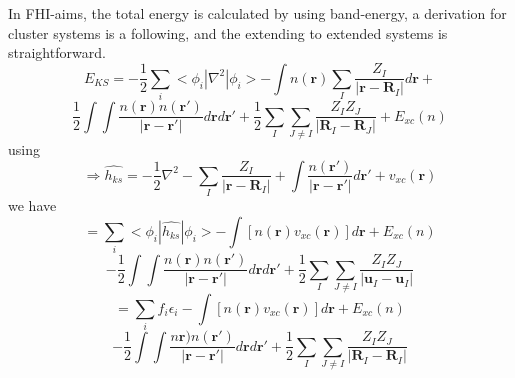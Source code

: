 In FHI-aims, the total energy is calculated by using band-energy, a derivation for cluster systems is a following, and the extending to extended systems is straightforward.
\[
E_{KS}=-\dfrac{1}{2}\sum_{i}<\phi_i|\nabla^2|\phi_i>-\int {n(\mathbf{r})  \sum_{I}\dfrac{Z_{I}}{|\mathbf{r}-\mathbf{R}_{I}|}  d\mathbf{r}}+
\]
\begin{equation}
 \dfrac{1}{2}\int \int {\dfrac{n(\mathbf{r}) n(\mathbf{r'}) }{|\mathbf{r}-\mathbf{r'} |}  d\mathbf{r}  d\mathbf{r'}} +\dfrac{1}{2}\sum_{I}\sum_{J\neq I}{\dfrac{Z_{I} Z_{J}}{|\mathbf{R}_{I}-\mathbf{R}_{J} |} }+ E_{xc}(n)
 \label{eq:E_KS_original}
\end{equation}
using 
\[
\Rightarrow
\hat{h_{ks}}=-\dfrac{1}{2}\nabla^2- \sum_{I}\dfrac{Z_{I}}{|\mathbf{r}-\mathbf{R}_{I}|}
+ \int {\dfrac{n(\mathbf{r'}) }{|\mathbf{r}-\mathbf{r'} |}  d\mathbf{r'}} + v_{xc}(\mathbf{r})
\]
we have 
\[
= \sum_{i}<\phi_i|\hat{h_{ks}}|\phi_i> -\int{[n(\mathbf{r}) v_{xc}(\mathbf{r})] d\mathbf{r}} +E_{xc}(n)
\]
\begin{equation}
-\dfrac{1}{2}\int \int {\dfrac{n(\mathbf{r}) n(\mathbf{r'}) }{|\mathbf{r}-\mathbf{r'} |}  d\mathbf{r}  d\mathbf{r'}} 
+\dfrac{1}{2}\sum_{I}\sum_{J\neq I}{\dfrac{Z_{I} Z_{J}}{|\mathbf{u}_{I}-\mathbf{u}_{I} |} }
\end{equation}
\[
=\sum_{i}{f_i \epsilon_{i}}-\int{[n(\mathbf{r}) v_{xc}(\mathbf{r})] d\mathbf{r}} +E_{xc}(n)
\]
\begin{equation}
-\dfrac{1}{2}\int \int {\dfrac{n\mathbf{r}) n(\mathbf{r'}) }{|\mathbf{r}-\mathbf{r'} |}  d\mathbf{r}  d\mathbf{r'}} 
+\dfrac{1}{2}\sum_{I}\sum_{J\neq I}{\dfrac{Z_{I} Z_{J}}{|\mathbf{R}_{I}-\mathbf{R}_{I} |} }
\end{equation}

